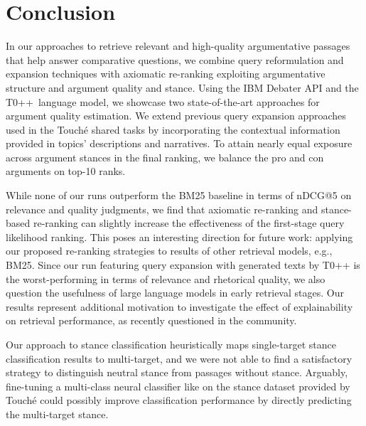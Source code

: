\section{Conclusion}

In our approaches to retrieve relevant and high-quality argumentative passages that help answer comparative questions, we combine query reformulation and expansion techniques with axiomatic re-ranking exploiting argumentative structure and argument quality and stance.
Using the IBM Debater API and the T0++~language model, we showcase two state-of-the-art approaches for argument quality estimation.
We extend previous query expansion approaches used in the Touch{\'e} shared tasks by incorporating the contextual information provided in topics' descriptions and narratives.
To attain nearly equal exposure across argument stances in the final ranking, we balance the pro and con arguments on top-10 ranks.

While none of our runs outperform the BM25 baseline in terms of nDCG@5 on relevance and quality judgments, we find that axiomatic re-ranking and stance-based re-ranking can slightly increase the effectiveness of the first-stage query likelihood ranking. This poses an interesting direction for future work: applying our proposed re-ranking strategies to results of other retrieval models, e.g., BM25.
Since our run featuring query expansion with generated texts by T0++ is the worst-performing in terms of relevance and rhetorical quality, we also question the usefulness of large language models in early retrieval stages. Our results represent additional motivation to investigate the effect of explainability on retrieval performance, as recently questioned in the community.

Our approach to stance classification heuristically maps single-target stance classification results to multi-target, and we were not able to find a satisfactory strategy to distinguish neutral stance from passages without stance.
Arguably, fine-tuning a multi-class neural classifier like \Bert on the stance dataset provided by Touch{\'e} could possibly improve classification performance by directly predicting the multi-target stance.